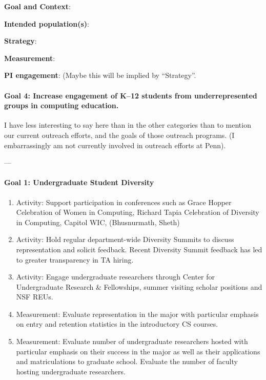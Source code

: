 \textbf{Goal and Context}:

\textbf{Intended population(s)}:

\textbf{Strategy}:

\textbf{Measurement}:

\textbf{PI engagement}: (Maybe this will be implied by ``Strategy''.

\paragraph*{Goal 4: Increase engagement of K--12 students from underrepresented
groups in computing education.}

I have less interesting to say here than in the other categories than to mention
our current outreach efforts, and the goals of those outreach programs. (I
embarrassingly am not currently involved in outreach efforts at Penn).

---

\paragraph*{Goal 1: Undergraduate Student Diversity}

\begin{enumerate}
\item Activity: Support participation in conferences such as Grace Hopper Celebration of Women in Computing, Richard Tapia Celebration of Diversity in Computing, Capitol WIC, (Bhusnurmath, Sheth)
\item Activity: Hold regular department-wide Diversity Summits to discuss representation and solicit feedback. Recent Diversity Summit feedback has led to greater transparency in TA hiring.
\item Activity: Engage undergraduate researchers through Center for Undergraduate Research \& Fellowships, summer visiting scholar positions and NSF REUs.
\item Measurement: Evaluate representation in the major with particular emphasis on entry and retention statistics in the introductory CS courses.
\item Measurement: Evaluate number of undergraduate researchers hosted with particular emphasis on their success in the major as well as their applications and matriculations to graduate school. Evaluate the number of faculty hosting undergraduate researchers.
\end{enumerate}

